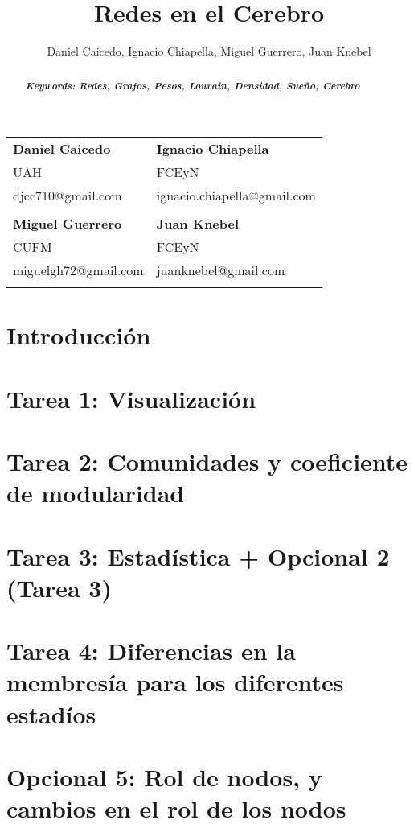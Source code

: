 \documentclass{icisfinal}
\title{Redes en el Cerebro}
\begin{document}
\author{Daniel Caicedo, Ignacio Chiapella, Miguel Guerrero, Juan Knebel}
\maketitle

\begin{table}[h!]
  \centering
  \LARGE
  \begin{tabularx}{\textwidth}{@{}*2{>{\centering\arraybackslash}X}@{}}
    \textbf{Daniel Caicedo}        & \textbf{Ignacio Chiapella} \\
    UAH & FCEyN   \\
    djcc710@gmail.com & ignacio.chiapella@gmail.com \\
    \\
    \textbf{Miguel Guerrero}        & \textbf{Juan Knebel} \\
    CUFM & FCEyN   \\
    miguelgh72@gmail.com & juanknebel@gmail.com \\
    \\
  \end{tabularx}
\end{table}

\begin{abstract}

  \emph{\textbf{Keywords: Redes, Grafos, Pesos, Louvain, Densidad, Sueño, Cerebro} }
\end{abstract}

\section{Introducción}


\newpage
\section{Tarea 1: Visualización}


\newpage
\section{Tarea 2: Comunidades y coeficiente de modularidad}


\newpage
\section{Tarea 3: Estadística + Opcional 2 (Tarea 3)}


\section{Tarea 4: Diferencias en la membresía para los diferentes estadíos}


\section{Opcional 5: Rol de nodos, y cambios en el rol de los nodos}


\printbibliography
\end{document}
